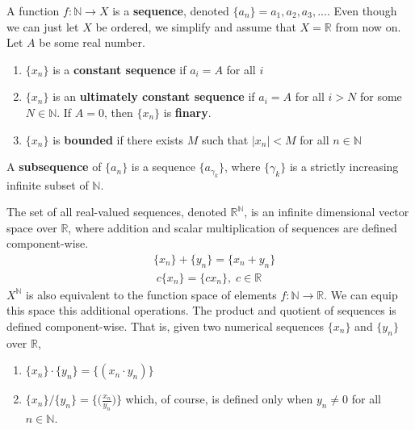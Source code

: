 \documentclass{article}
\begin{document}
      \begin{definition}[Sequence]
        A function $f: \mathbb{N} \longrightarrow X$ is a \textbf{sequence}, denoted $\{a_n\} = a_1, a_2, a_3, ...$. Even though we can just let $X$ be ordered, we simplify and assume that $X = \mathbb{R}$ from now on. Let $A$ be some real number. 
        \begin{enumerate}
          \item $\{x_n\}$ is a \textbf{constant sequence} if $a_i = A$ for all $i$
          \item $\{x_n\}$ is an \textbf{ultimately constant sequence} if $a_i = A$ for all $i > N$ for some $N \in \mathbb{N}$. If $A = 0$, then $\{x_n\}$ is \textbf{finary}.
          \item $\{x_n\}$ is \textbf{bounded} if there exists $M$ such that $|x_n| < M$ for all $n \in \mathbb{N}$
        \end{enumerate}
        A \textbf{subsequence} of $\{ a_n\}$ is a sequence $\{a_{\gamma_k}\}$, where $\{\gamma_k\}$ is a strictly increasing infinite subset of $\mathbb{N}$. 
      \end{definition}

      \begin{definition}
        The set of all real-valued sequences, denoted $\mathbb{R}^\mathbb{N}$, is an infinite dimensional vector space over $\mathbb{R}$, where addition and scalar multiplication of sequences are defined component-wise. 
        \begin{align*}
            &\{x_n\} + \{y_n\} = \{x_n + y_n\}\\
            &\; c \{x_n\} = \{c x_n\}, \; c \in \mathbb{R}
        \end{align*}
        $X^\mathbb{N}$ is also equivalent to the function space of elements $f: \mathbb{N} \longrightarrow \mathbb{R}$. We can equip this space this additional operations. The product and quotient of sequences is defined component-wise. That is, given two numerical sequences $\{x_n\}$ and $\{y_n\}$ over $\mathbb{R}$, 
        \begin{enumerate}
          \item $\{x_n\} \cdot \{y_n\} = \{(x_n \cdot y_n)\}$
          \item $\{x_n\} / \{y_n\} = \Big\{ \Big(\frac{x_n}{y_n}\Big) \Big\}$ which, of course, is defined only when $y_n \neq 0$ for all $n \in \mathbb{N}$. 
        \end{enumerate}
      \end{definition}
\end{document}
